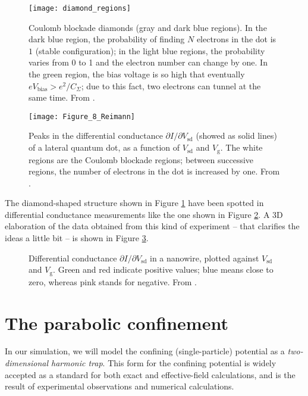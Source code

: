 \begin{figure}[h]%
	\centering
	\texttt{[image: diamond\_regions]}
	\caption{Coulomb blockade diamonds (gray and dark blue regions). In the dark blue region, the probability of finding $N$ electrons in the dot is $1$ (stable configuration); in the light blue regions, the probability varies from 0 to 1 and the electron number can change by one. In the green region, the bias voltage is so high that eventually $eV_{\text{bias}} > e^2/C_{\Sigma}$; due to this fact, two electrons can tunnel at the same time. From \cite{Fasth2007}.}
	\label{fig:diamond_regions}
\end{figure}

\begin{figure}[H]
	\centering
	\texttt{[image: Figure\_8\_Reimann]}
	\caption{Peaks in the differential conductance $\partial I/\partial V_{\text{sd}}$ (showed as solid lines) of a lateral quantum dot, as a function of $V_{\text{sd}}$ and $V_{\text{g}}$. The white regions are the Coulomb blockade regions; between successive regions, the number of electrons in the dot is increased by one. From \cite{Reimann2002}.}
	\label{fig:Figure_8_Reimann}
\end{figure}

The diamond-shaped structure shown in Figure \ref{fig:diamond_regions} have been spotted in differential conductance measurements like the one shown in Figure \ref{fig:Figure_8_Reimann}. A 3D elaboration of the data obtained from this kind of experiment -- that clarifies the ideas a little bit -- is shown in Figure \ref{fig:diff_conductance_3D}.

\begin{figure}[h]%
	\centering
	\def\svgwidth{0.8\textwidth}
	
	\caption{Differential conductance $\partial I/\partial V_{\text{sd}}$ in a nanowire, plotted against $V_{\text{sd}}$ and $V_{\text{g}}$. Green and red indicate positive values; blue means close to zero, whereas pink stands for negative. From \cite{Weinmann1994}.}
	\label{fig:diff_conductance_3D}
\end{figure}

\section{The parabolic confinement}
In our simulation, we will model the confining (single-particle) potential as a \emph{two-dimensional harmonic trap}. This form for the confining potential is widely accepted as a standard for both exact and effective-field calculations, and is the result of experimental observations and numerical calculations.

